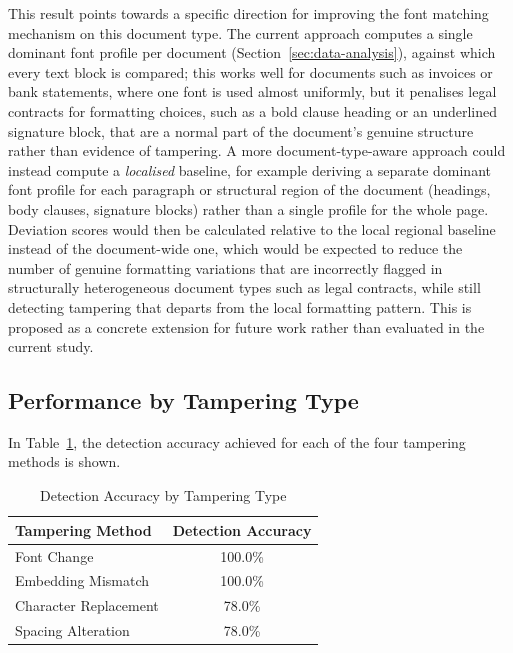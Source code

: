 \noindent This result points towards a specific direction for improving the font matching mechanism on this document type. The current approach computes a single dominant font profile per document (Section~\ref{sec:data-analysis}), against which every text block is compared; this works well for documents such as invoices or bank statements, where one font is used almost uniformly, but it penalises legal contracts for formatting choices, such as a bold clause heading or an underlined signature block, that are a normal part of the document's genuine structure rather than evidence of tampering. A more document-type-aware approach could instead compute a \emph{localised} baseline, for example deriving a separate dominant font profile for each paragraph or structural region of the document (headings, body clauses, signature blocks) rather than a single profile for the whole page. Deviation scores would then be calculated relative to the local regional baseline instead of the document-wide one, which would be expected to reduce the number of genuine formatting variations that are incorrectly flagged in structurally heterogeneous document types such as legal contracts, while still detecting tampering that departs from the local formatting pattern. This is proposed as a concrete extension for future work rather than evaluated in the current study.

\subsection{Performance by Tampering Type}

In Table~\ref{tab:tamper_type}, the detection accuracy achieved for each of the four tampering methods is shown.

\begin{table}[H]
    \centering
    \caption{Detection Accuracy by Tampering Type}
    \begin{tabular}{lc} \hline
        \textbf{Tampering Method} & \textbf{Detection Accuracy} \\ \hline
        Font Change & 100.0\% \\
        Embedding Mismatch & 100.0\% \\
        Character Replacement & 78.0\% \\
        Spacing Alteration & 78.0\% \\ \hline
    \end{tabular}
    \label{tab:tamper_type}
\end{table}

